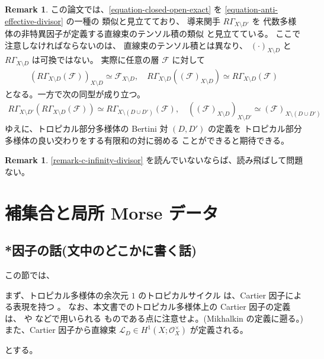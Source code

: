 \documentclass[a4paper,dvipdfmx,reqno,12pt]{amsart}
\theoremstyle{definition}
\newtheorem{remark}[theorem]{Remark}
\numberwithin{equation}{section}
\begin{document}
\begin{remark}
この論文では、\eqref{equation-closed-open-exact} を
\eqref{equation-anti-effective-divisor} の一種の
類似と見立てており、
導来関手 $R\Gamma_{X\setminus D'}$ を
代数多様体の非特異因子が定義する直線束のテンソル積の類似
と見立てている。
ここで注意しなければならないのは、
直線束のテンソル積とは異なり、
$(\cdot )_{X\setminus D}$
と $R\Gamma_{X\setminus D}$ は可換ではない。
実際に任意の層 $\mathcal{F}$ に対して
\begin{align}
(R\Gamma_{X\setminus D}(\mathcal{F}))_{X\setminus D}
\simeq 
\mathcal{F}_{X\setminus D}, \quad
R\Gamma_{X\setminus D}((\mathcal{F})_{X\setminus D})
\simeq R\Gamma_{X\setminus D}(\mathcal{F})
\end{align}
となる。一方で次の同型が成り立つ。
\begin{align}
R\Gamma_{X\setminus D'}
(R\Gamma_{X\setminus D}(\mathcal{F}))
\simeq R\Gamma_{X\setminus (D\cup D')}(\mathcal{F}), \quad
((\mathcal{F})_{X\setminus D})_{X\setminus D'}
\simeq (\mathcal{F})_{X\setminus (D \cup D')}
\end{align}
ゆえに、トロピカル部分多様体の Bertini 対 $(D,D')$ の定義を
トロピカル部分多様体の良い交わりをする有限和の対に弱める
ことができると期待できる。

\end{remark}

\begin{remark}
\label{remark-floer-differential}
\cref{remark-c-infinity-divisor}
を読んでいないならば、読み飛ばして問題ない。
\end{remark}


\section{補集合と局所 Morse データ}




\subsection{*因子の話(文中のどこかに書く話)}
この節では、

まず、トロピカル多様体の余次元 $1$ のトロピカルサイクル
は、Cartier 因子による表現を持つ
\cite[Proposition 3.27]{shaw2015tropical}。
なお、本文書でのトロピカル多様体上の 
Cartier 因子の定義は、
\cite{shaw2015tropical} や
\cite{demedrano2023chern} などで用いられる
ものである点に注意せよ。(Mikhalkin の定義に遡る。)
また、Cartier 因子から直線束
$\mathcal{L}_{D}\in H^{1}(X;\mathcal{O}_X^{\times})$
が定義される。


とする\cite[Deifinition 3.10]{MR4637248}。
\end{document}
